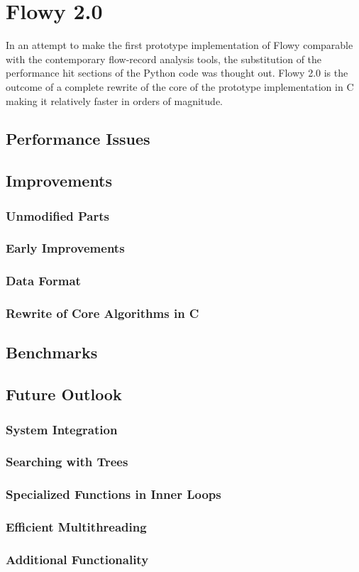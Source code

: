 \chapter{Flowy 2.0}\label{ch:flowy-2}

In an attempt to make the first prototype implementation of Flowy comparable with the contemporary flow-record analysis tools, the substitution of the performance hit sections of the Python code was thought out. Flowy 2.0 \cite{jschauer:thesis:2011} is the outcome of a complete rewrite of the core of the prototype implementation in C making it relatively faster in orders of magnitude.

\section{Performance Issues}\label{sec:performance-issues}
\section{Improvements}\label{sec:improvements}
	\subsection{Unmodified Parts}\label{subsec:unmodified-parts}
	\subsection{Early Improvements}\label{subsec:early-improvements}
	\subsection{Data Format}\label{subsec:data-format}
	\subsection{Rewrite of Core Algorithms in C}\label{subsec:core-alg-c}
\section{Benchmarks}\label{sec:benchmarks}
\section{Future Outlook}\label{sec:flowy2-future}
	\subsection{System Integration}\label{subsec:system-integration}
	\subsection{Searching with Trees}\label{subsec:search-trees}
	\subsection{Specialized Functions in Inner Loops}\label{subsec:special-fns}
	\subsection{Efficient Multithreading}\label{subsec:multithreading}
	\subsection{Additional Functionality}\label{subsec:additional-functionality}